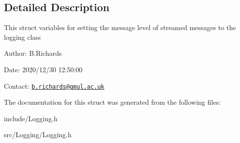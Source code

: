 \subsection{Detailed Description}
This struct variables for setting the message level of streamed messages to the logging class

\begin{DoxyParagraph}{Author\-:}
B.\-Richards 
\end{DoxyParagraph}
\begin{DoxyParagraph}{Date\-:}
2020/12/30 12\-:50\-:00 
\end{DoxyParagraph}
Contact\-: \href{mailto:b.richards@qmul.ac.uk}{\tt b.\-richards@qmul.\-ac.\-uk} 

The documentation for this struct was generated from the following files\-:\begin{DoxyCompactItemize}
\item 
include/Logging.\-h\item 
src/\-Logging/Logging.\-h\end{DoxyCompactItemize}
